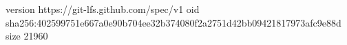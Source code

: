 version https://git-lfs.github.com/spec/v1
oid sha256:402599751e667a0e90b704ee32b374080f2a2751d42bb09421817973afc9e88d
size 21960
